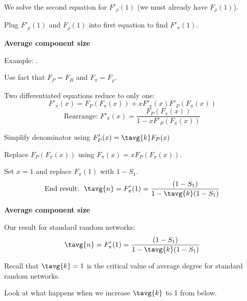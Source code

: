 \begin{frame}[label=]
\begin{frame}[label=]
\begin{frame}[label=]
\begin{frame}[label=]
\begin{frame}[label=]
\begin{frame}[label=]
\begin{frame}[label=]
\begin{frame}[label=]
\begin{frame}[label=]
\begin{frame}[label=]
\begin{frame}[label=]
\begin{frame}[label=rn-sneakyresult1]
\begin{frame}[label=]
\begin{frame}[label=]
\begin{frame}[label=rn-sneakyresult2]
\begin{frame}[label=]
\begin{frame}[label=]
\begin{frame}[label=]
\begin{frame}[label=]
\begin{frame}[label=]
\begin{frame}[label=]
\begin{frame}[label=]
\begin{frame}[label=]
\begin{frame}[label=]
    We solve the second equation for $F'_\rho(1)$
    (we must already have $F_\rho(1)$).
  
    Plug $F'_\rho(1)$ and $F_\rho(1)$ into first equation to find $F'_\pi(1)$.
  

  
\begin{frame}[label=]
  \textbf{Average component size}

    \alert{Example}: .
    
    
      Use fact that $F_P=F_R$ and $F_\pi=F_\rho$.
    
      Two differentiated equations reduce to only one:
    $$
    F'_{\pi}(x)
    =
    F_{P}
    \left(
      F_{\pi} (x)
    \right)
    +
    x
    F'_{\pi} (x)
    F'_{P}
    \left(
      F_{\pi} (x)
    \right)
    $$
  {
    $$
    \mbox{Rearrange: \ \ }
    F'_{\pi}(x)
    =
    \frac{
      F_{P}
      \left(
        F_{\pi} (x)
      \right)
    }
    {
      1 -
      x
      F'_{P}
      \left(
        F_{\pi} (x)
      \right)
    }
    $$
    }
    
      Simplify denominator using $F'_P(x) = \tavg{k} F_P(x)$
    
      Replace $F_P(F_\pi(x))$ using $F_\pi(x) = x F_P(F_\pi(x))$.
    
      Set $x=1$ and replace $F_\pi(1)$ with $1-S_1$.
    {
      $$
      \mbox{End result:\ \ }
      \tavg{n} 
      = 
      F'_{\pi}(1)
      =
      \frac{
        \left(
          1-S_1
        \right)
      }
      {
        1 -
        \tavg{k}(1-S_1)
      }
      $$
    }
    
    
  
\begin{frame}[label=]
  \textbf{Average component size}

  
  
    Our result for standard random networks:
    $$
    \tavg{n} 
    = 
    F'_{\pi}(1)
    =
    \frac{
      \left(
        1-S_1
      \right)
    }
    {
      1 -
      \tavg{k}(1-S_1)
    }
    $$
  
    Recall that $\tavg{k}=1$ is the critical value 
    of average degree for standard random networks.
  
    Look at what happens when we increase $\tavg{k}$ 
    to 1 from below.
  

\end{frame}
\end{frame}
\end{frame}
\end{frame}
\end{frame}
\end{frame}
\end{frame}
\end{frame}
\end{frame}
\end{frame}
\end{frame}
\end{frame}
\end{frame}
\end{frame}
\end{frame}
\end{frame}
\end{frame}
\end{frame}
\end{frame}
\end{frame}
\end{frame}
\end{frame}
\end{frame}
\end{frame}
\end{frame}
\end{frame}

